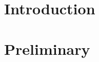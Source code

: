 \begin{abstract}

\end{abstract}

\section{Introduction}


\section{Preliminary}



%	
	

% 

\section{\FIXEDCARPOOL{}}


\section{\UWCARPOOL{}}


\section{\UCUDCARPOOL{}}


\section{\CARPOOL{}}

